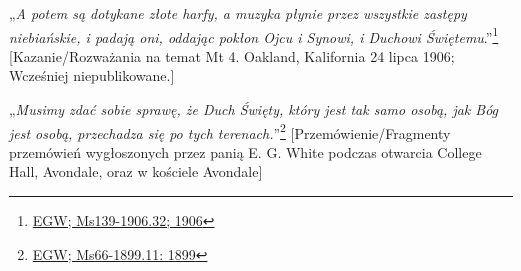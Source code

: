 „\textit{A potem są dotykane złote harfy, a muzyka płynie przez wszystkie zastępy niebiańskie, i padają oni, oddając pokłon Ojcu i Synowi, i Duchowi Świętemu}.”\footnote{\href{https://egwwritings.org/?ref=en_Ms139-1906.32&para=9579.38}{EGW; Ms139-1906.32; 1906}} [Kazanie/Rozważania na temat Mt 4. Oakland, Kalifornia 24 lipca 1906; Wcześniej niepublikowane.]

„\textit{Musimy zdać sobie sprawę, że Duch Święty, który jest tak samo osobą, jak Bóg jest osobą, przechadza się po tych terenach.}”\footnote{\href{https://egwwritings.org/?ref=en_Ms66-1899.11&para=6622.19}{EGW; Ms66-1899.11: 1899}} [Przemówienie/Fragmenty przemówień wygłoszonych przez panią E. G. White podczas otwarcia College Hall, Avondale, oraz w kościele Avondale]
